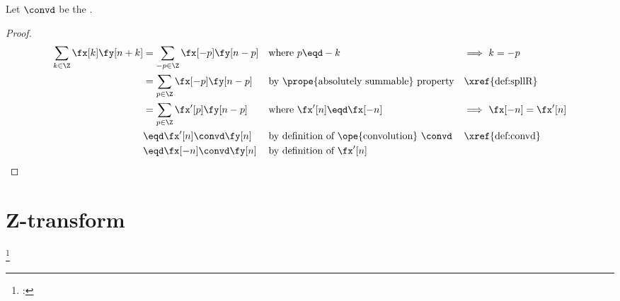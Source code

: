 \begin{proposition}
\label{prop:conv_knk}
Let $\convd$ be the  .
\end{proposition}
\begin{proof}
\begin{align*}
  \sum_{k\in\Z} \fx[k]\fy[n+k] 
    &= \sum_{-p\in\Z} \fx[-p]\fy[n-p] 
    && \text{where $p\eqd -k$}
    && \text{$\implies$ $k=-p$}
  \\&= \sum_{p\in\Z} \fx[-p]\fy[n-p] 
    && \text{by \prope{absolutely summable} property}
    && \text{\xref{def:spllR}}
  \\&= \sum_{p\in\Z} \fx'[p]\fy[n-p] 
    && \text{where $\fx'[n] \eqd\fx[-n]$}
    && \text{$\implies$ $\fx[-n]=\fx'[n]$}
  \\&\eqd \fx'[n]\convd\fy[n]
    && \text{by definition of \ope{convolution} $\convd$}
    && \text{\xref{def:convd}}
  \\&\eqd \fx[-n]\convd\fy[n]
    && \text{by definition of $\fx'[n]$}
\end{align*}
\end{proof}

\section {Z-transform}
\begin{definition}
\footnote{
  : 
  }
\label{def:opZ}
\end{definition}


